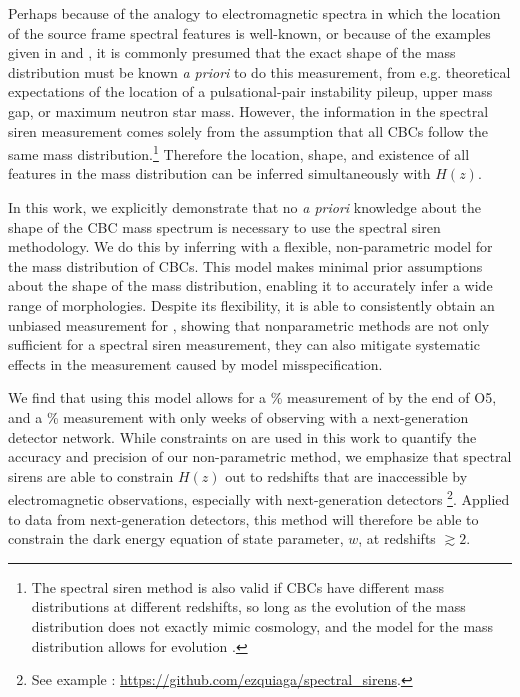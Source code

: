 \documentclass[]{aastex631}
\begin{document}
Perhaps because of the analogy to electromagnetic spectra in which the location of the source frame spectral features is well-known, or because of the examples given in \cite{farr_future_2019} and \cite{chernoff_gravitational_1993}, it is commonly presumed that the exact shape of the mass distribution must be known \emph{a priori} to do this measurement, from e.g. theoretical expectations of the location of a pulsational-pair instability pileup, upper mass gap, or maximum neutron star mass. 
However, the information in the spectral siren measurement comes solely from the assumption that all \acp{CBC} follow the same mass distribution.\footnote{
The spectral siren method is also valid if \acp{CBC} have different mass distributions at different redshifts, so long as the evolution of the mass distribution does not exactly mimic cosmology, and the model for the mass distribution allows for evolution \citep{ezquiaga_spectral_2022}. 
}
Therefore the location, shape, and existence of all features in the mass distribution can be inferred simultaneously with $H(z)$. 

In this work, we explicitly demonstrate that no \emph{a priori} knowledge about the shape of the \ac{CBC} mass spectrum is necessary to use the spectral siren methodology. 
We do this by inferring \Ho with a flexible, non-parametric model for the mass distribution of \acp{CBC}. 
This model makes minimal prior assumptions about the shape of the mass distribution, enabling it to accurately infer a wide range of morphologies.
Despite its flexibility, it is able to consistently obtain an unbiased measurement for \Ho, showing that nonparametric methods are not only sufficient for a spectral siren measurement, they can also mitigate systematic effects in the measurement caused by model misspecification.

We find that using this model allows for a \% measurement of \Ho{} by the end of \ac{O5}, and a \% measurement with only  weeks of observing with a next-generation detector network. 
While constraints on \Ho{} are used in this work to quantify the accuracy and precision of our non-parametric method, we emphasize that spectral sirens are able to constrain $H(z)$ out to redshifts that are inaccessible by electromagnetic observations, especially with next-generation detectors \citep{ezquiaga_spectral_2022, Chen:2024gdn,You:2020wju}\footnote{See example : \href{https://github.com/ezquiaga/spectral_sirens}{https://github.com/ezquiaga/spectral\_sirens}.}.
Applied to data from next-generation detectors, this method will therefore be able to constrain the dark energy equation of state parameter, $w$, at redshifts $\gtrsim 2$.
\end{document}
